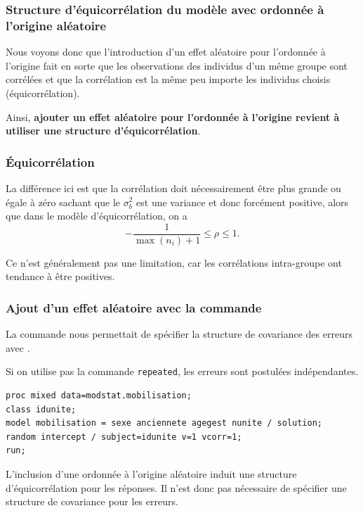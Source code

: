 \documentclass{beamer}
\begin{document}
\begin{frame}[fragile]
\frametitle{Structure d'équicorrélation du modèle avec ordonnée à l'origine aléatoire}
\bi
\item Nous voyons donc que l'introduction d'un effet aléatoire pour l'ordonnée à l'origine
fait en sorte que les observations des individus d'un même groupe sont
corrélées et que \alert{la corrélation est la même} peu importe les individus choisis (équicorrélation).
\item Ainsi, \textbf{ajouter un effet aléatoire pour l'ordonnée à l'origine revient à utiliser une
structure d'équicorrélation}.
\ei 
\end{frame}
\begin{frame}
\frametitle{Équicorrélation}
\bi 
\item La différence ici est que la corrélation doit nécessairement être
plus grande ou égale à zéro sachant que le $\sigma^2_b$ est une variance et donc forcément positive, alors que dans le  modèle d'équicorrélation, on a
\[-\frac{1}{\max(n_i)+1} \leq \rho \leq 1.\]
\item Ce n'est généralement pas une limitation, car les corrélations intra-groupe ont tendance à être positives.

\ei
\end{frame}


\begin{frame}[fragile]
\frametitle{Ajout d'un effet aléatoire avec la commande }
\bi
\item La commande  nous permettait de spécifier la structure de covariance des erreurs avec .
\item Si on utilise pas la commande \texttt{repeated}, les erreurs sont postulées indépendantes.
\ei
\begin{tcolorbox}[colback=white, colframe=hecblue, title=Code \SASlang pour ajuster un modèle avec ordonnée à l'origine aléatoire avec erreurs indépendantes]
\begin{footnotesize}
\begin{verbatim}
proc mixed data=modstat.mobilisation;
class idunite;
model mobilisation = sexe anciennete agegest nunite / solution;
random intercept / subject=idunite v=1 vcorr=1;
run;
\end{verbatim}
\end{footnotesize}
\end{tcolorbox}
{\footnotesize L'inclusion d'une ordonnée à l'origine aléatoire \alert{induit} une structure d'équicorrélation pour les réponses. Il n'est donc pas nécessaire de spécifier une structure de covariance pour les erreurs.

}
\end{frame}
\end{document}
